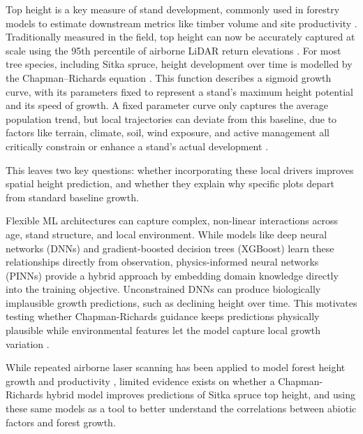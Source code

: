 \documentclass[11pt,a4paper]{report}
\begin{document}
Top height is a key measure of stand development, commonly used in forestry models to estimate downstream metrics like timber volume and site productivity \cite{ForestResearch2026Sitka_C1_SS}. Traditionally measured in the field, top height can now be accurately captured at scale using the 95th percentile of airborne LiDAR return elevations \cite{suarezminguez2008Practical_C1_SS}. For most tree species, including Sitka spruce, height development over time is modelled by the Chapman--Richards equation \cite{pommerening2015Methods_C2_CR}. This function describes a sigmoid growth curve, with its parameters fixed to represent a stand's maximum height potential and its speed of growth. A fixed parameter curve only captures the average population trend, but local trajectories can deviate from this baseline, due to factors like terrain, climate, soil, wind exposure, and active management all critically constrain or enhance a stand's actual development \cite{socha2023Higher_C1_SS, cameron2015Building_C1_SS}.

This leaves two key questions: whether incorporating these local drivers improves spatial height prediction, and whether they explain why specific plots depart from standard baseline growth.

Flexible ML architectures can capture complex, non-linear interactions across age, stand structure, and local environment. While models like deep neural networks (DNNs) and gradient-boosted decision trees (XGBoost) learn these relationships directly from observation, physics-informed neural networks (PINNs) provide a hybrid approach by embedding domain knowledge directly into the training objective. Unconstrained DNNs can produce biologically implausible growth predictions, such as declining height over time. This motivates testing whether Chapman-Richards guidance keeps predictions physically plausible while environmental features let the model capture local growth variation \cite{karpatne2017Theory_C4_NN, pichler2025Inferring_C4_NN}.

While repeated airborne laser scanning has been applied to model forest height growth and productivity \cite{Janiec2023ALSHeightGrowth, TymianskaCzabanska2021WeatherHeightGrowth, Tompalski2015ALSProductivity}, limited evidence exists on whether a Chapman-Richards hybrid model improves predictions of Sitka spruce top height, and using these same models as a tool to better understand the correlations between abiotic factors and forest growth.
\end{document}
